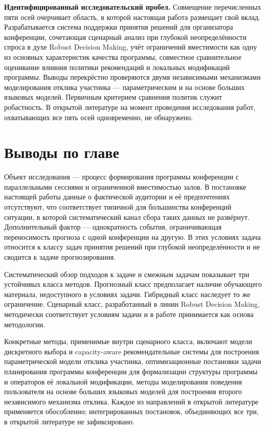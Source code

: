 \textbf{Идентифицированный исследовательский пробел.} Совмещение перечисленных пяти осей очерчивает область, в которой настоящая работа размещает свой вклад. Разрабатывается система поддержки принятия решений для организатора конференции, сочетающая сценарный анализ при глубокой неопределённости спроса в духе Robust Decision Making, учёт ограничений вместимости как одну из основных характеристик качества программы, совместное сравнительное оценивание влияния политики рекомендаций и локальных модификаций программы. Выводы перекрёстно проверяются двумя независимыми механизмами моделирования отклика участника --- параметрическим и на основе больших языковых моделей. Первичным критерием сравнения политик служит робастность. В открытой литературе на момент проведения исследования работ, охватывающих все пять осей одновременно, не обнаружено.


\section{Выводы по главе}

Объект исследования --- процесс формирования программы конференции с параллельными сессиями и ограниченной вместимостью залов. В постановке настоящей работы данные о фактической аудитории и её предпочтениях отсутствуют, что соответствует типичной для большинства конференций ситуации, в которой систематический канал сбора таких данных не развёрнут. Дополнительный фактор --- однократность события, ограничивающая переносимость прогноза с одной конференции на другую. В этих условиях задача относится к классу задач принятия решений при глубокой неопределённости и не сводится к задаче прогнозирования.

Систематический обзор подходов к задаче и смежным задачам показывает три устойчивых класса методов. Прогнозный класс предполагает наличие обучающего материала, недоступного в условиях задачи. Гибридный класс наследует то же ограничение. Сценарный класс, разработанный в линии Robust Decision Making, методически соответствует условиям задачи и в работе принимается как основа методологии.

Конкретные методы, применимые внутри сценарного класса, включают модели дискретного выбора и capacity-aware рекомендательные системы для построения параметрической модели отклика участника, оптимизационные постановки задачи планирования программы конференции для формализации структуры программы и операторов её локальной модификации, методы моделирования поведения пользователя на основе больших языковых моделей для построения второго независимого механизма отклика. Каждое из направлений в открытой литературе применяется обособленно; интегрированных постановок, объединяющих все три, в открытой литературе не зафиксировано.

